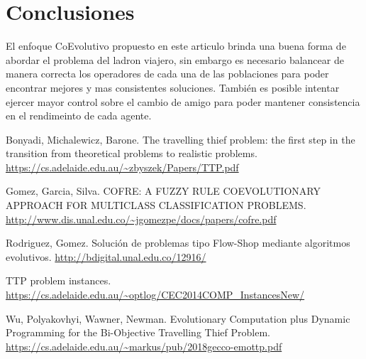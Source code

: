 \documentclass[twocolumn]{IEEEtran}
\begin{document}
\section{Conclusiones}
El enfoque CoEvolutivo propuesto en este articulo brinda una buena forma de abordar el problema 
del ladron viajero, sin embargo es necesario balancear de manera correcta los operadores de cada
una de las poblaciones para poder encontrar mejores y mas consistentes soluciones. También es 
posible intentar ejercer mayor control sobre el cambio de amigo para poder mantener
consistencia en el rendimeinto de cada agente.


\begin{thebibliography}{X}
    \item Bonyadi, Michalewicz, Barone. The travelling thief problem: the first step in the
    transition from theoretical problems to realistic problems. \url{https://cs.adelaide.edu.au/~zbyszek/Papers/TTP.pdf}  
    \item Gomez, Garcia, Silva. COFRE: A FUZZY RULE COEVOLUTIONARY APPROACH FOR 
    MULTICLASS CLASSIFICATION PROBLEMS. \url{http://www.dis.unal.edu.co/~jgomezpe/docs/papers/cofre.pdf}
    \item Rodriguez, Gomez. Solución de problemas tipo Flow-Shop mediante algoritmos evolutivos.
    \url {http://bdigital.unal.edu.co/12916/}
    \item TTP problem instances. \url{https://cs.adelaide.edu.au/~optlog/CEC2014COMP_InstancesNew/}
    \item Wu, Polyakovhyi, Wawner, Newman. Evolutionary Computation plus Dynamic Programming for the
    Bi-Objective Travelling Thief Problem. \url{https://cs.adelaide.edu.au/~markus/pub/2018gecco-emottp.pdf}   
\end{thebibliography}
\end{document}

